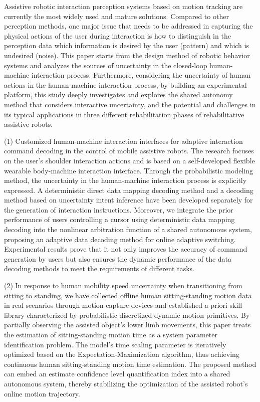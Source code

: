 \begin{abstract*}
Assistive robotic interaction perception systems based on motion tracking are currently the most widely used and mature solutions. Compared to other perception methods, one major issue that needs to be addressed in capturing the physical actions of the user during interaction is how to distinguish in the perception data which information is desired by the user (pattern) and which is undesired (noise). This paper starts from the design method of robotic behavior systems and analyzes the sources of uncertainty in the closed-loop human-machine interaction process. Furthermore, considering the uncertainty of human actions in the human-machine interaction process, by building an experimental platform, this study deeply investigates and explores the shared autonomy method that considers interactive uncertainty, and the potential and challenges in its typical applications in three different rehabilitation phases of rehabilitative assistive robots.

(1) Customized human-machine interaction interfaces for adaptive interaction command decoding in the control of mobile assistive robots. The research focuses on the user's shoulder interaction actions and is based on a self-developed flexible wearable body-machine interaction interface. Through the probabilistic modeling method, the uncertainty in the human-machine interaction process is explicitly expressed. A deterministic direct data mapping decoding method and a decoding method based on uncertainty intent inference have been developed separately for the generation of interaction instructions. Moreover, we integrate the prior performance of users controlling a cursor using deterministic data mapping decoding into the nonlinear arbitration function of a shared autonomous system, proposing an adaptive data decoding method for online adaptive switching. Experimental results prove that it not only improves the accuracy of command generation by users but also ensures the dynamic performance of the data decoding methods to meet the requirements of different tasks.

(2) In response to human mobility speed uncertainty when transitioning from sitting to standing, we have collected offline human sitting-standing motion data in real scenarios through motion capture devices and established a priori skill library characterized by probabilistic discretized dynamic motion primitives. By partially observing the assisted object's lower limb movements, this paper treats the estimation of sitting-standing motion time as a system parameter identification problem. The model's time scaling parameter is iteratively optimized based on the Expectation-Maximization algorithm, thus achieving continuous human sitting-standing motion time estimation. The proposed method can embed an estimate confidence level quantification index into a shared autonomous system, thereby stabilizing the optimization of the assisted robot's online motion trajectory.


\end{abstract*}
